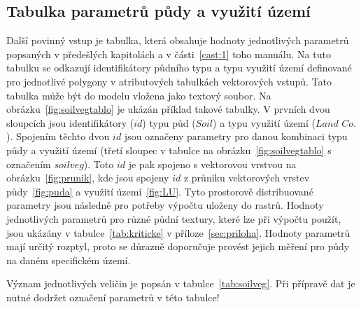 \subsection{Tabulka parametrů půdy a využití území}  \label{sec:upravatabulkyparametru}

Další povinný vstup je tabulka, která obsahuje hodnoty jednotlivých parametrů popsaných v předešlých kapitolách a v části~\ref{cast:1} toho manuálu. Na tuto tabulku se odkazují identifikátory půdního typu a typu využití území definované pro jednotlivé polygony v atributových tabulkách vektorových vstupů. Tato tabulka může být do modelu vložena jako textový soubor. Na obrázku~\ref{fig:soilvegtablo} je ukázán příklad takové tabulky. V prvních dvou sloupcích jsou identifikátory ($id$) typu půd ($Soil$) a typu využití území ($Land$ $Co.$). Spojením těchto dvou $id$ jsou označeny parametry pro danou kombinaci typu půdy a využití území (třetí sloupec v tabulce na obrázku~\ref{fig:soilvegtablo} s označením $soilveg$). Toto $id$ je pak spojeno s vektorovou vrstvou na obrázku~\ref{fig:prunik}, kde jsou spojeny $id$ z průniku vektorových vrstev půdy~\ref{fig:puda} a využití území~\ref{fig:LU}. Tyto prostorově distribuované parametry jsou následně pro potřeby výpočtu uloženy do rastrů. Hodnoty jednotlivých parametrů pro různé půdní textury, které lze při výpočtu použít, jsou ukázány v tabulce~\ref{tab:kriticke} v příloze~\ref{sec:priloha}. Hodnoty parametrů mají určitý rozptyl, proto se důrazně doporučuje provést jejich měření pro půdy na daném specifickém území.

Význam jednotlivých veličin je popsán v tabulce~\ref{tab:soilveg}. Při přípravě dat je nutné dodržet označení parametrů v této tabulce!




